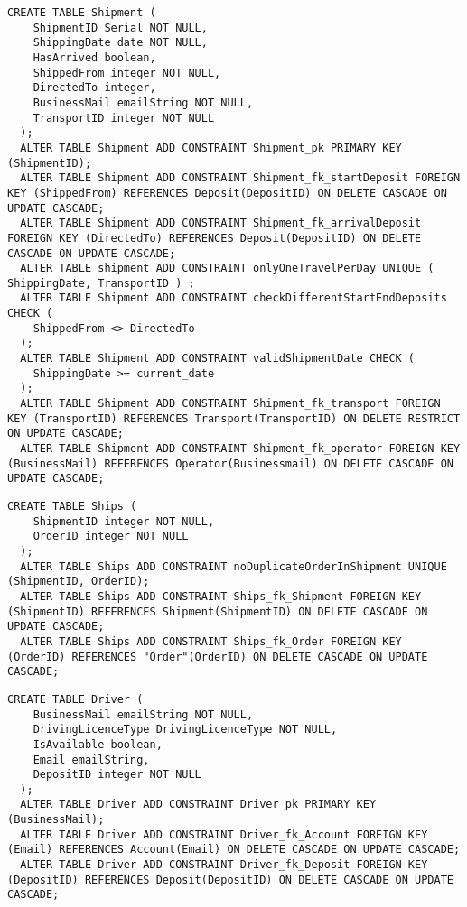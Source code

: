 \newpage
\begin{lstlisting}[caption={Creazione della tabella \textbf{Shipment}}]
  CREATE TABLE Shipment (
    ShipmentID Serial NOT NULL,
    ShippingDate date NOT NULL,
    HasArrived boolean,
    ShippedFrom integer NOT NULL,
    DirectedTo integer,
    BusinessMail emailString NOT NULL,
    TransportID integer NOT NULL
  );
  ALTER TABLE Shipment ADD CONSTRAINT Shipment_pk PRIMARY KEY (ShipmentID);
  ALTER TABLE Shipment ADD CONSTRAINT Shipment_fk_startDeposit FOREIGN KEY (ShippedFrom) REFERENCES Deposit(DepositID) ON DELETE CASCADE ON UPDATE CASCADE;
  ALTER TABLE Shipment ADD CONSTRAINT Shipment_fk_arrivalDeposit FOREIGN KEY (DirectedTo) REFERENCES Deposit(DepositID) ON DELETE CASCADE ON UPDATE CASCADE;
  ALTER TABLE shipment ADD CONSTRAINT onlyOneTravelPerDay UNIQUE ( ShippingDate, TransportID ) ;
  ALTER TABLE Shipment ADD CONSTRAINT checkDifferentStartEndDeposits CHECK (
    ShippedFrom <> DirectedTo
  );
  ALTER TABLE Shipment ADD CONSTRAINT validShipmentDate CHECK (
    ShippingDate >= current_date
  );
  ALTER TABLE Shipment ADD CONSTRAINT Shipment_fk_transport FOREIGN KEY (TransportID) REFERENCES Transport(TransportID) ON DELETE RESTRICT ON UPDATE CASCADE;
  ALTER TABLE Shipment ADD CONSTRAINT Shipment_fk_operator FOREIGN KEY (BusinessMail) REFERENCES Operator(Businessmail) ON DELETE CASCADE ON UPDATE CASCADE;
\end{lstlisting} %

\begin{lstlisting}[caption={Creazione della tabella \textbf{Ships}}]
  CREATE TABLE Ships ( 
    ShipmentID integer NOT NULL,
    OrderID integer NOT NULL
  );
  ALTER TABLE Ships ADD CONSTRAINT noDuplicateOrderInShipment UNIQUE (ShipmentID, OrderID);
  ALTER TABLE Ships ADD CONSTRAINT Ships_fk_Shipment FOREIGN KEY (ShipmentID) REFERENCES Shipment(ShipmentID) ON DELETE CASCADE ON UPDATE CASCADE;
  ALTER TABLE Ships ADD CONSTRAINT Ships_fk_Order FOREIGN KEY (OrderID) REFERENCES "Order"(OrderID) ON DELETE CASCADE ON UPDATE CASCADE;
\end{lstlisting}

\newpage
\begin{lstlisting}[caption={Creazione della tabella \textbf{Driver}}]
  CREATE TABLE Driver (
    BusinessMail emailString NOT NULL,
    DrivingLicenceType DrivingLicenceType NOT NULL,
    IsAvailable boolean,
    Email emailString, 
    DepositID integer NOT NULL 
  );
  ALTER TABLE Driver ADD CONSTRAINT Driver_pk PRIMARY KEY (BusinessMail);
  ALTER TABLE Driver ADD CONSTRAINT Driver_fk_Account FOREIGN KEY (Email) REFERENCES Account(Email) ON DELETE CASCADE ON UPDATE CASCADE;
  ALTER TABLE Driver ADD CONSTRAINT Driver_fk_Deposit FOREIGN KEY (DepositID) REFERENCES Deposit(DepositID) ON DELETE CASCADE ON UPDATE CASCADE;
\end{lstlisting}

